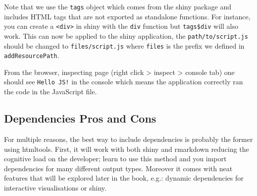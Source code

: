 \documentclass[
]{krantz}
\makeatletter
\newenvironment{Shaded}{\begin{snugshade}}{\end{snugshade}}
\newcommand{\CommentTok}[1]{\textcolor[rgb]{0.37,0.37,0.37}{\textit{#1}}}
\newcommand{\ControlFlowTok}[1]{\textcolor[rgb]{0.27,0.27,0.27}{\textbf{#1}}}
\newcommand{\DataTypeTok}[1]{\textcolor[rgb]{0.27,0.27,0.27}{#1}}
\newcommand{\KeywordTok}[1]{\textcolor[rgb]{0.27,0.27,0.27}{\textbf{#1}}}
\newcommand{\NormalTok}[1]{#1}
\newcommand{\OperatorTok}[1]{\textcolor[rgb]{0.43,0.43,0.43}{\textbf{#1}}}
\newcommand{\StringTok}[1]{\textcolor[rgb]{0.5,0.5,0.5}{#1}}
\newenvironment{kframe}{%
\medskip{}
\setlength{\fboxsep}{.8em}
 \def\at@end@of@kframe{}%
 \ifinner\ifhmode%
  \def\at@end@of@kframe{\end{minipage}}%
  \begin{minipage}{\columnwidth}%
 \fi\fi%
 \def\FrameCommand##1{\hskip\@totalleftmargin \hskip-\fboxsep
 \colorbox{shadecolor}{##1}\hskip-\fboxsep
     \hskip-\linewidth \hskip-\@totalleftmargin \hskip\columnwidth}%
 \MakeFramed {\advance\hsize-\width
   \@totalleftmargin\z@ \linewidth\hsize
   \@setminipage}}%
 {\par\unskip\endMakeFramed%
 \at@end@of@kframe}
\renewenvironment{Shaded}{\begin{kframe}}{\end{kframe}}
\makeatother
\begin{document}
Note that we use the \texttt{tags} object which comes from the shiny package and includes HTML tags that are not exported as standalone functions. For instance, you can create a \texttt{\textless{}div\textgreater{}} in shiny with the \texttt{div} function but \texttt{tags\$div} will also work. This can now be applied to the shiny application, the \texttt{path/to/script.js} should be changed to \texttt{files/script.js} where \texttt{files} is the prefix we defined in \texttt{addResourcePath}.

\begin{Shaded}
\end{Shaded}

From the browser, inspecting page (right click \textgreater{} inspect \textgreater{} console tab) one should see \texttt{Hello\ JS!} in the console which means the application correctly ran the code in the JavaScript file.

\hypertarget{basics-deps-pro-cons}{%
\subsection{Dependencies Pros and Cons}\label{basics-deps-pro-cons}}

For multiple reasons, the best way to include dependencies is probably the former using htmltools. First, it will work with both shiny and rmarkdown \citep{R-rmarkdown} reducing the cognitive load on the developer; learn to use this method and you import dependencies for many different output types. Moreover it comes with neat features that will be explored later in the book, e.g.: dynamic dependencies for interactive visualisations or shiny.
\end{document}
